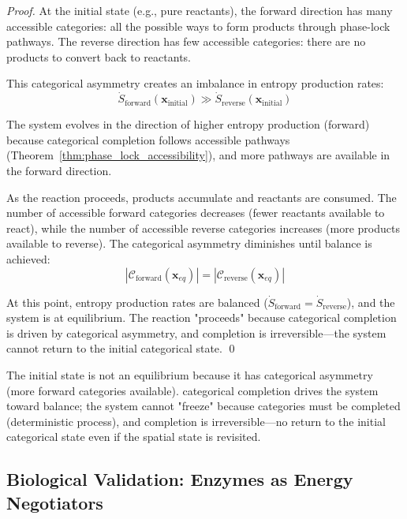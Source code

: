 \documentclass[12pt,a4paper]{article}
\theoremstyle{definition}
\theoremstyle{remark}
\begin{document}
\begin{proof}
At the initial state (e.g., pure reactants), the forward direction has many accessible categories: all the possible ways to form products through phase-lock pathways. The reverse direction has few accessible categories: there are no products to convert back to reactants.

This categorical asymmetry creates an imbalance in entropy production rates:
\begin{equation}
\dot{S}_{\text{forward}}(\mathbf{x}_{\text{initial}}) \gg \dot{S}_{\text{reverse}}(\mathbf{x}_{\text{initial}})
\end{equation}

The system evolves in the direction of higher entropy production (forward) because categorical completion follows accessible pathways (Theorem~\ref{thm:phase_lock_accessibility}), and more pathways are available in the forward direction.

As the reaction proceeds, products accumulate and reactants are consumed. The number of accessible forward categories decreases (fewer reactants available to react), while the number of accessible reverse categories increases (more products available to reverse). The categorical asymmetry diminishes until balance is achieved:
\begin{equation}
|\mathcal{C}_{\text{forward}}(\mathbf{x}_{eq})| = |\mathcal{C}_{\text{reverse}}(\mathbf{x}_{eq})|
\end{equation}

At this point, entropy production rates are balanced ($\dot{S}_{\text{forward}} = \dot{S}_{\text{reverse}}$), and the system is at equilibrium. The reaction "proceeds" because categorical completion is driven by categorical asymmetry, and completion is irreversible—the system cannot return to the initial categorical state. \qed
\end{proof}

The initial state is not an equilibrium because it has categorical asymmetry (more forward categories available). categorical completion drives the system toward balance; the system cannot "freeze" because categories must be completed (deterministic process), and completion is irreversible—no return to the initial categorical state even if the spatial state is revisited.

\subsection{Biological Validation: Enzymes as Energy Negotiators}
\end{document}
